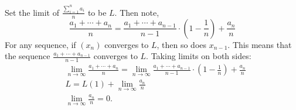 \documentclass{article}
\begin{document}
Set the limit of $\frac{\sum_{i=1}^n a_i}{n}$ to be $L$. Then note,
\begin{equation*}
    \frac{a_1+\cdots+a_n}n = \frac{a_1+\cdots+a_{n-1}}{n-1}\cdot\left(1-\frac{1}{n}\right)+\frac{a_n}n
\end{equation*}
For any sequence, if $(x_n)$ converges to $L$, then so does $x_{n-1}$. This means that the sequence $\frac{a_1+\cdots+a_{n-1}}{n-1}$ converges to $L$. Taking limits on both sides:
\begin{align*}
    &\lim_{n \to \infty}\frac{a_1+\cdots+a_n}n = \lim_{n \to \infty}\frac{a_1+\cdots+a_{n-1}}{n-1}\cdot\left(1-\frac{1}{n}\right)+\frac{a_n}n \\
    &L = L(1) + \lim_{n \to \infty} \frac{a_n}{n} \\
    &\lim_{n \to \infty} \frac{a_n}{n} = 0.
\end{align*}
\end{document}
